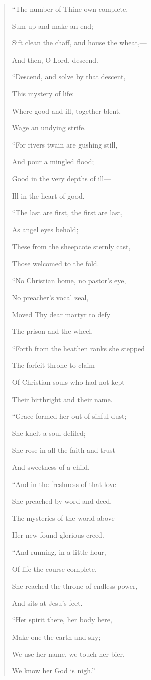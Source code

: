 \begin{quote}

``The number of Thine own complete,

Sum up and make an end;

Sift clean the chaff, and house the wheat,—

And then, O Lord, descend.

``Descend, and solve by that descent,

This mystery of life;

Where good and ill, together blent,

Wage an undying strife.

``For rivers twain are gushing still,

And pour a mingled flood;

Good in the very depths of ill—

Ill in the heart of good.

``The last are first, the first are last,

As angel eyes behold;

These from the sheepcote sternly cast,

Those welcomed to the fold.

``No Christian home, no pastor's eye,

No preacher's vocal zeal,

Moved Thy dear martyr to defy

The prison and the wheel.

``Forth from the heathen ranks she stepped

The forfeit throne to claim

Of Christian souls who had not kept

Their birthright and their name.

``Grace formed her out of sinful dust;

She knelt a soul defiled;

She rose in all the faith and trust

And sweetness of a child.

``And in the freshness of that love

She preached by word and deed,

The mysteries of the world above—

Her new-found glorious creed.

``And running, in a little hour,

Of life the course complete,

She reached the throne of endless power,

And sits at Jesu's feet.

``Her spirit there, her body here,

Make one the earth and sky;

We use her name, we touch her bier,

We know her God is nigh.''

\end{quote}


